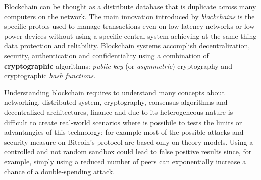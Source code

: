 \newline\newline
Blockchain can be thought as a distribute database that is duplicate across many computers on the network.
The main innovation introduced by \textit{blockchains} is the specific protols used to manage transactions even on low-latency networks or low-power devices without using a specific central system achieving at the same thing data protection and reliability.\newline
Blockchain systems accomplish decentralization, security, authentication and confidentiality using a combination of \textbf{cryptographic} algorithms: \textit{public-key} (or \textit{asymmetric}) cryptography and cryptographic \textit{hash functions}.\newline

Understanding blockchain requires to understand many concepts about networking, distributed system, cryptography, consensus algorithms and decentralized architectures, finance and due to its heterogeneous nature is difficult to create real-world scenarios where is possibile to tests the limits or advantangies of this technology: for example most of the possible attacks and security measure on Bitcoin's protocol are based only on theory models.\newline
Using a controlled and not random sandbox could lead to false positive results since, for example, simply using a reduced number of peers can exponentially increase a chance of a double-spending attack.

